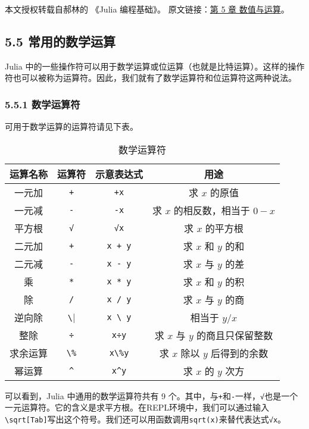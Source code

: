 
本文授权转载自郝林的 《Julia 编程基础》。 原文链接：\href{https://github.com/hyper0x/JuliaBasics/blob/master/book/ch05.md}{第 5 章 数值与运算}。


\subsection{5.5 常用的数学运算}

Julia 中的一些操作符可以用于数学运算或位运算（也就是比特运算）。这样的操作符也可以被称为运算符。因此，我们就有了数学运算符和位运算符这两种说法。

\subsubsection{5.5.1 数学运算符}

可用于数学运算的运算符请见下表。
\begin{table}[ht]
\centering
\caption{数学运算符}\label{JuC5S5_tab1}
\begin{tabular}{|c|c|c|c|}
\hline
运算名称 & 运算符 & 示意表达式 & 用途 \\
\hline
一元加 & \verb|+| & \verb|+x| & 求 $x$ 的原值 \\
\hline
一元减 & \verb|-| & \verb|-x| & 求 $x$ 的相反数，相当于 $0-x$ \\
\hline
平方根 & \verb|√|  & \verb|√x| & 求 $x$ 的平方根 \\
\hline
二元加 & \verb|+| & \verb|x + y| & 求 $x$ 和 $y$ 的和 \\
\hline
二元减 & \verb|-| & \verb|x - y| & 求 $x$ 与 $y$ 的差 \\
\hline
乘 & \verb|*| & \verb|x * y| & 求 $x$ 和 $y$ 的积 \\
\hline
除 & \verb|/| & \verb|x / y| & 求 $x$ 与 $y$ 的商 \\
\hline
逆向除 & \verb|\| & \verb|x \ y| & 相当于 $y / x$ \\
\hline
整除 & \verb|÷| & \verb|x÷y| & 求 $x$ 与 $y$ 的商且只保留整数 \\
\hline
求余运算 & \verb|\%| & \verb|x\%y| & 求 $x$ 除以 $y$ 后得到的余数 \\
\hline
幂运算 & \verb|^| & \verb|x^y| & 求 $x$ 的 $y$ 次方 \\
\hline
\end{tabular}
\end{table}

可以看到，Julia 中通用的数学运算符共有 9 个。其中，与\verb|+|和\verb|-|一样，\verb|√|也是一个一元运算符。它的含义是求平方根。在REPL环境中，我们可以通过输入\verb|\sqrt[Tab]|写出这个符号。我们还可以用函数调用\verb|sqrt(x)|来替代表达式\verb|√x|。

